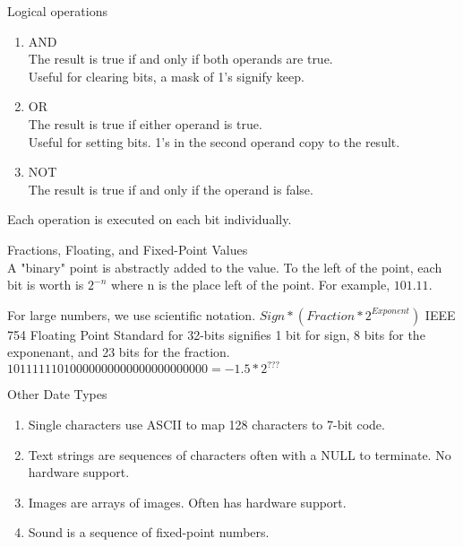 \documentclass{article}
\begin{document}
\noindent
Logical operations
\begin{enumerate}
  \item {AND\\The result is true if and only if both operands are true.\\Useful for clearing bits, a mask of 1's signify keep.}
  \item {OR\\The result is true if either operand is true.\\Useful for setting bits. 1's in the second operand copy to the result.}
  \item {NOT\\The result is true if and only if the operand is false.}
\end{enumerate}
\noindent
Each operation is executed on each bit individually.

\noindent
\Large
Fractions, Floating, and Fixed-Point Values\\
\normalsize
\indent
A "binary" point is abstractly added to the value. To the left of the point, each bit is worth is $2^{-n}$ where n is the place left of the point. For example, $101.11$.

For large numbers, we use scientific notation. $Sign * (Fraction * 2^{Exponent})$
IEEE 754 Floating Point Standard for 32-bits signifies 1 bit for sign, 8 bits for the exponenant, and 23 bits for the fraction.
$1 01111110 10000000000000000000000 = -1.5*2^{???}$

\noindent
\Large
Other Date Types
\normalsize
\indent
\begin{enumerate}
  \item Single characters use ASCII to map 128 characters to 7-bit code.
  \item Text strings are sequences of characters often with a NULL to terminate. No hardware support.
  \item Images are arrays of images. Often has hardware support.
  \item Sound is a sequence of fixed-point numbers.
\end{enumerate}
\end{document}
